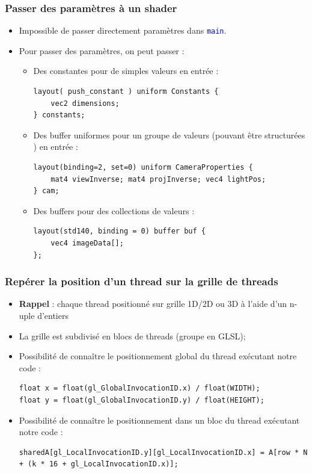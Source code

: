 \documentclass{beamer}
\begin{document}
\begin{frame}[fragile]
\lstset{style=customglsl}
\frametitle{Passer des paramètres à un shader}

\begin{itemize}
\item Impossible de passer directement paramètres dans \textcolor{blue}{\texttt{main}}.
\item Pour passer des paramètres, on peut passer :
\begin{itemize}
    \item Des constantes pour de simples valeurs en entrée :
\begin{lstlisting}
layout( push_constant ) uniform Constants {
    vec2 dimensions;
} constants;    
\end{lstlisting}    
    \item Des buffer uniformes pour un groupe de valeurs (pouvant être structurées ) en entrée :
\begin{lstlisting}
layout(binding=2, set=0) uniform CameraProperties {
    mat4 viewInverse; mat4 projInverse; vec4 lightPos;
} cam;    
\end{lstlisting}
    \item Des buffers pour des collections de valeurs :
\begin{lstlisting}
layout(std140, binding = 0) buffer buf {
    vec4 imageData[];
};    
\end{lstlisting}
\end{itemize}
\end{itemize}
\end{frame}

\begin{frame}[fragile]
\frametitle{Repérer la position d'un thread sur la grille de threads}
\lstset{style=customglsl}

\begin{itemize}
\item \textbf{Rappel} : chaque thread positionné sur grille 1D/2D ou 3D à l'aide d'un n-uple d'entiers
\item La grille est subdivisé en blocs de threads (groupe en GLSL);
\item Possibilité de connaître le positionnement global du thread exécutant notre code :
\begin{lstlisting}
float x = float(gl_GlobalInvocationID.x) / float(WIDTH);
float y = float(gl_GlobalInvocationID.y) / float(HEIGHT);
\end{lstlisting}
\item Possibilité de connaître le positionnement dans un bloc du thread exécutant notre code :
\begin{lstlisting}
sharedA[gl_LocalInvocationID.y][gl_LocalInvocationID.x] = A[row * N + (k * 16 + gl_LocalInvocationID.x)];
\end{lstlisting}
\end{itemize}
\end{frame}
\end{document}
